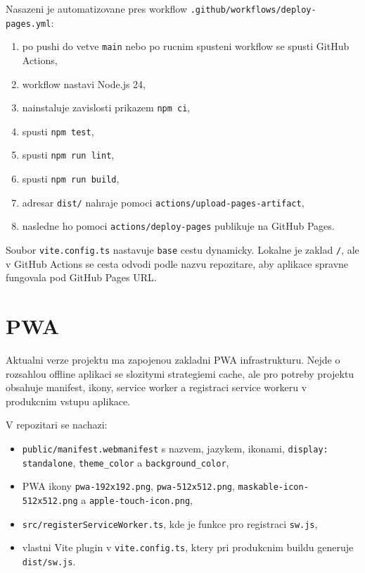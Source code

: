 \documentclass[12pt,a4paper]{article}
\begin{document}
Nasazeni je automatizovane pres workflow \texttt{.github/workflows/deploy-pages.yml}:
\begin{enumerate}[leftmargin=2em]
  \item po pushi do vetve \texttt{main} nebo po rucnim spusteni workflow se spusti GitHub Actions,
  \item workflow nastavi Node.js 24,
  \item nainstaluje zavislosti prikazem \texttt{npm ci},
  \item spusti \texttt{npm test},
  \item spusti \texttt{npm run lint},
  \item spusti \texttt{npm run build},
  \item adresar \texttt{dist/} nahraje pomoci \texttt{actions/upload-pages-artifact},
  \item nasledne ho pomoci \texttt{actions/deploy-pages} publikuje na GitHub Pages.
\end{enumerate}

Soubor \texttt{vite.config.ts} nastavuje \texttt{base} cestu dynamicky. Lokalne je zaklad \texttt{/}, ale v GitHub Actions se cesta odvodi podle nazvu repozitare, aby aplikace spravne fungovala pod GitHub Pages URL.

\section{PWA}

Aktualni verze projektu ma zapojenou zakladni PWA infrastrukturu. Nejde o rozsahlou offline aplikaci se slozitymi strategiemi cache, ale pro potreby projektu obsahuje manifest, ikony, service worker a registraci service workeru v produkcnim vstupu aplikace.

V repozitari se nachazi:
\begin{itemize}[leftmargin=2em]
  \item \texttt{public/manifest.webmanifest} s nazvem, jazykem, ikonami, \texttt{display: standalone}, \texttt{theme\_color} a \texttt{background\_color},
  \item PWA ikony \texttt{pwa-192x192.png}, \texttt{pwa-512x512.png}, \texttt{maskable-icon-512x512.png} a \texttt{apple-touch-icon.png},
  \item \texttt{src/registerServiceWorker.ts}, kde je funkce pro registraci \texttt{sw.js},
  \item vlastni Vite plugin v \texttt{vite.config.ts}, ktery pri produkcnim buildu generuje \texttt{dist/sw.js}.
\end{itemize}
\end{document}

